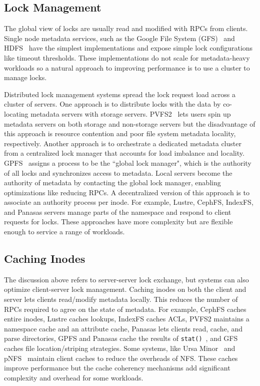 \subsection{Lock Management}
\label{sec:lock-management}

The global view of locks are usually read and modified with RPCs from clients.  Single
node metadata services, such as the Google File System
(GFS)~\cite{ghemawat:sosp2003-gfs} and
HDFS~\cite{shvachko:login2012-hdfs-scalability} have the simplest
implementations and expose simple lock configurations like timeout thresholds.
These implementations do not scale for metadata-heavy workloads so a natural
approach to improving performance is to use a cluster to manage locks.

Distributed lock management systems spread the lock request load across a
cluster of servers. One approach is to distribute locks with the data by
co-locating metadata servers with storage servers.
PVFS2~\cite{devulapalli:ipdps07-pvfs2} lets users spin up metadata servers on
both storage and non-storage servers but the disadvantage of this approach is
resource contention and poor file system metadata locality, respectively.
Another approach is to orchestrate a dedicated metadata cluster from a
centralized lock manager that accounts for load imbalance and locality.
GPFS~\cite{schmuck:fast2002-gpfs} assigns a process to be the ``global lock
manager", which is the authority of all locks and synchronizes access to
metadata. Local servers become the authority of metadata by contacting the
global lock manager, enabling optimizations like reducing RPCs. A decentralized
version of this approach is to associate an authority process per inode. For
example, Lustre, CephFS, IndexFS, and Panasas servers manage parts of the
namespace and respond to client requests for locks. These approaches have more
complexity but are flexible enough to service a range of workloads.

\subsection{Caching Inodes}
\label{sec:caching-inodes}

The discussion above refers to server-server lock exchange, but systems can
also optimize client-server lock management. Caching inodes on both the client
and server lets clients read/modify metadata locally.  This reduces the number
of RPCs required to agree on the state of metadata.  For example, CephFS caches
entire inodes, Lustre caches lookups, IndexFS caches ACLs, PVFS2 maintains a
namespace cache and an attribute cache, Panasas lets clients read, cache, and
parse directories, GPFS and Panasas cache the results of
\texttt{stat()}~\cite{depardon:tech13-survey}, and GFS caches file
location/striping strategies.  Some systems, like Ursa
Minor~\cite{sinnamohideen:atc2010-ursa} and
pNFS~\cite{hildebrand:msst2005-pnfs} maintain client caches to reduce the
overheads of NFS. These caches improve performance but the cache coherency
mechanisms add significant complexity and overhead for some workloads.

